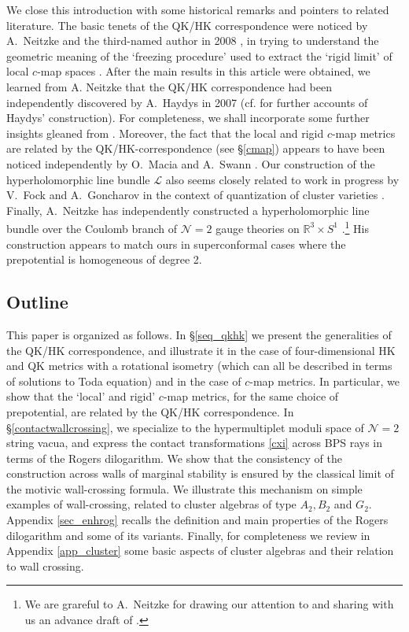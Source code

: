 \documentclass[12pt,reqno]{article}
\numberwithin{equation}{section}
\newcommand{\cN}{\mathcal{N}}
\newcommand{\IR}{\mathbb{R}}
\newcommand{\lb}{\mathscr{L}}
\numberwithin{equation}{section}
\begin{document}
We close this introduction with some historical remarks and
pointers to related literature.
The basic tenets of the QK/HK correspondence were
noticed by A.~Neitzke and the third-named author in 2008
\cite{BPNeitzke}, in trying to understand the geometric meaning of the
`freezing procedure' used to extract the `rigid limit' of local $c$-map spaces
\cite{Rocek:2005ij,Saueressig:2007dr}.
After the main results in this article were
obtained, we learned from A. Neitzke that the QK/HK correspondence
had been independently discovered by A.~Haydys \cite{1143.53043}
in 2007 (cf. \cite{Hitchin-Newton2011,SwannTalk}
for further accounts of Haydys' construction). For completeness, we shall incorporate some
further insights gleaned from \cite{1143.53043}. Moreover, the fact that the local and
rigid $c$-map metrics are related  by the QK/HK-correspondence (see \S\ref{cmap})
appears to have been  noticed independently  by O.~Macia and A.~Swann \cite{SwannTalk}.
Our construction of the hyperholomorphic line bundle $\lb$
also seems closely related to work in progress by V.~Fock and A.~Goncharov in the
context of quantization of cluster varieties  \cite{FGgeometricquantization}.
Finally, A.~Neitzke has  independently
constructed a hyperholomorphic line bundle over the Coulomb
branch of $\cN=2$ gauge theories on $\IR^3\times S^1$ \cite{Neitzke:2011za}.\footnote{We
are grareful to A.~Neitzke for drawing our attention to \cite{1143.53043,Hitchin-Newton2011}
and sharing with us an advance draft of \cite{Neitzke:2011za}.}
His construction appears to match ours in superconformal cases where the prepotential is
homogeneous of degree 2.

\subsection*{Outline}

This paper is organized as follows. In \S\ref{seq_qkhk} we present the generalities
of the QK/HK correspondence, and illustrate it in the case of four-dimensional HK and
QK metrics with a rotational isometry (which can all be described in terms of solutions
to Toda equation) and in the case of $c$-map metrics. In particular, we show
that the `local' and rigid' $c$-map metrics, for the same choice of prepotential, are related
by the QK/HK correspondence. In \S \ref{contactwallcrossing}, we specialize to
the hypermultiplet moduli space of $\cN=2$ string vacua, and express
the contact transformations \eqref{cxi} across BPS rays in terms of the Rogers
dilogarithm. We show that the consistency of the construction across walls of marginal
stability is ensured by the classical limit of the motivic wall-crossing formula. We illustrate
this mechanism on simple examples of wall-crossing, related to cluster algebras
of type $A_2, B_2$ and $G_2$. Appendix \ref{sec_enhrog} recalls the definition and main properties of the Rogers
dilogarithm and some of its variants. Finally, for completeness we review in Appendix \ref{app_cluster} some basic
aspects of cluster algebras and their relation to wall crossing.
\end{document}
